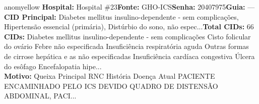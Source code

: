 \documentclass[a4paper,10pt]{article}
\begin{document}
\begin{anomalycard}[Interna\c{c}\~{a}o \#413 | Pac. \#484 | MODERADO (z=2.13) | LOS: 19d | 04/03/2026\,$\to$\,—]{anomyellow}
\textbf{Hospital:} Hospital \#23\quad \textbf{Fonte:} GHO-ICS\quad \textbf{Senha:} 20407975\quad \textbf{Guia:} ---\\

\textbf{CID Principal:} {\small Diabetes mellitus insulino-dependente - sem complicações, Hipertensão essencial (primária), Distúrbio do sono, não espec...}\quad\textbf{Total CIDs:} 66\\

\textbf{CIDs:} {\scriptsize Diabetes mellitus insulino-dependente - sem complicações \textbar{} Cisto folicular do ovário \textbar{} Febre não especificada \textbar{} Insuficiência respiratória aguda \textbar{} Outras formas de cirrose hepática e as não especificadas \textbar{} Insuficiência cardíaca congestiva \textbar{} Úlcera do esôfago \textbar{} Encefalopatia hipe...}\\

\textbf{Motivo:} {\scriptsize Queixa Principal    RNC    História Doença Atual    PACIENTE ENCAMINHADO PELO ICS DEVIDO QUADRO DE DISTENSÃO ABDOMINAL, PACI...}\\

\end{anomalycard}
\end{document}
